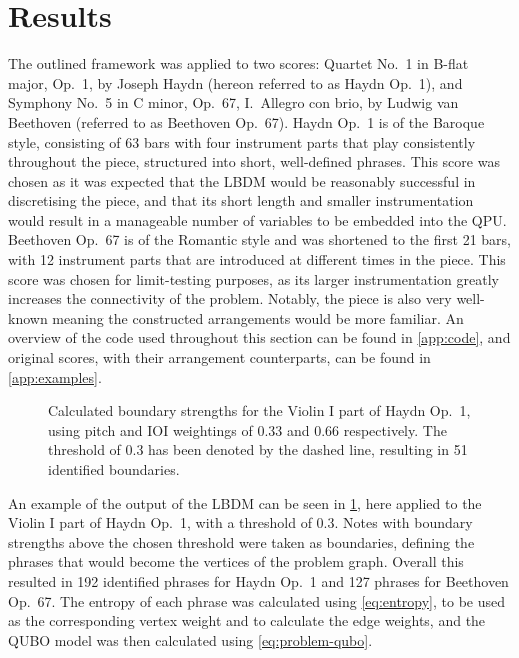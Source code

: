 \documentclass[12pt]{article}
\theoremstyle{definition}
\begin{document}
\section{Results}

The outlined framework was applied to two scores: Quartet No.\ 1 in B-flat major, Op.\ 1, by Joseph Haydn (hereon referred to as Haydn Op.\ 1), and Symphony No.\ 5 in C minor, Op.\ 67, I.\ Allegro con brio, by Ludwig van Beethoven (referred to as Beethoven Op.\ 67). Haydn Op.\ 1 is of the Baroque style, consisting of 63 bars with four instrument parts that play consistently throughout the piece, structured into short, well-defined phrases. This score was chosen as it was expected that the LBDM would be reasonably successful in discretising the piece, and that its short length and smaller instrumentation would result in a manageable number of variables to be embedded into the QPU. Beethoven Op.\ 67 is of the Romantic style and was shortened to the first 21 bars, with 12 instrument parts that are introduced at different times in the piece. This score was chosen for limit-testing purposes, as its larger instrumentation greatly increases the connectivity of the problem. Notably, the piece is also very well-known meaning the constructed arrangements would be more familiar.
An overview of the code used throughout this section can be found in \cref{app:code}, and original scores, with their arrangement counterparts, can be found in \cref{app:examples}.

\begin{figure}[h]
    \small
    
    \caption{Calculated boundary strengths for the Violin I part of Haydn Op.\ 1, using pitch and IOI weightings of \num{0.33} and \num{0.66} respectively. The threshold of \num{0.3} has been denoted by the dashed line, resulting in \num{51} identified boundaries.}
    \label{fig:phrase-extraction}
\end{figure}

An example of the output of the LBDM can be seen in \cref{fig:phrase-extraction}, here applied to the {Violin I} part of Haydn Op.\ 1, with a threshold of \num{0.3}. Notes with boundary strengths above the chosen threshold were taken as boundaries, defining the phrases that would become the vertices of the problem graph. Overall this resulted in \num{192} identified phrases for Haydn Op.\ 1 and \num{127} phrases for Beethoven Op.\ 67. The entropy of each phrase was calculated using \cref{eq:entropy}, to be used as the corresponding vertex weight and to calculate the edge weights, and the QUBO model was then calculated using \cref{eq:problem-qubo}.
\end{document}
